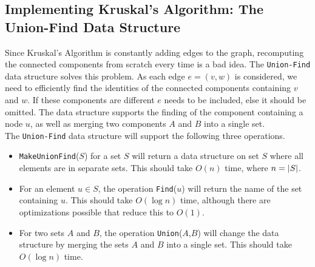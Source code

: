 \documentclass[]{article}
\begin{document}
	\subsection{Implementing Kruskal's Algorithm: The Union-Find Data Structure}
		Since Kruskal's Algorithm is constantly adding edges to the graph, recomputing the connected components from scratch every time is a bad idea. The \texttt{Union-Find} data structure solves this problem. As each edge $e = (v,w)$ is considered, we need to efficiently find the identities of the connected components containing $v$ and $w$. If these components are different $e$ needs to be included, else it should be omitted. The data structure supports the finding of the component containing a node $u$, as well as merging two components $A$ and $B$ into a single set. \\
		
		The \texttt{Union-Find} data structure will support the following three operations.
		\begin{itemize}
			\item \texttt{MakeUnionFind}($S$) for a set $S$ will return a \uf data structure on set $S$ where all elements are in separate sets. This should take $O(n)$ time, where $n = \lvert S \rvert$.
			\item For an element $u \in S$, the operation \texttt{Find}($u$) will return the name of the set containing $u$. This should take $O(\log n)$ time, although there are optimizations possible that reduce this to $O(1)$.
			\item For two sets $A$ and $B$, the operation \texttt{Union}($A$,$B$) will change the data structure by merging the sets $A$ and $B$ into a single set. This should take $O(\log n)$ time.
		\end{itemize}
\end{document}
